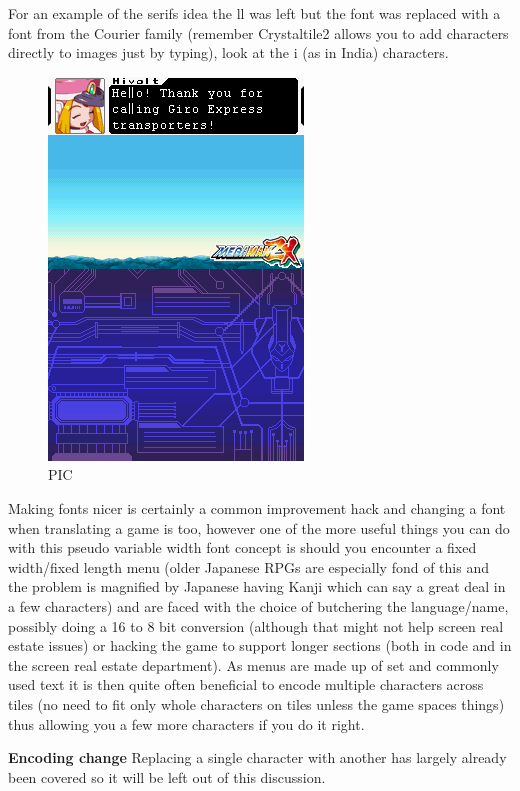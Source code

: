\documentclass[
]{book}
\begin{document}
For an example of the serifs idea the ll was left but the font was replaced with a font from the Courier family (remember Crystaltile2 allows you to add characters directly to images just by typing), look at the i (as in India) characters.

\begin{figure}
\centering
\includegraphics{images/123_home_fast6191_romhackingguide_unrenamed_fil___inal_borders_romhackingguidefontpseudoedit2.png}
\caption{PIC}
\end{figure}

Making fonts nicer is certainly a common improvement hack and changing a font when translating a game is too, however one of the more useful things you can do with this pseudo variable width font concept is should you encounter a fixed width/fixed length menu (older Japanese RPGs are especially fond of this and the problem is magnified by Japanese having Kanji which can say a great deal in a few characters) and are faced with the choice of butchering the language/name, possibly doing a 16 to 8 bit conversion (although that might not help screen real estate issues) or hacking the game to support longer sections (both in code and in the screen real estate department). As menus are made up of set and commonly used text it is then quite often beneficial to encode multiple characters across tiles (no need to fit only whole characters on tiles unless the game spaces things) thus allowing you a few more characters if you do it right.

\textbf{Encoding change} Replacing a single character with another has largely already been covered so it will be left out of this discussion.
\end{document}
